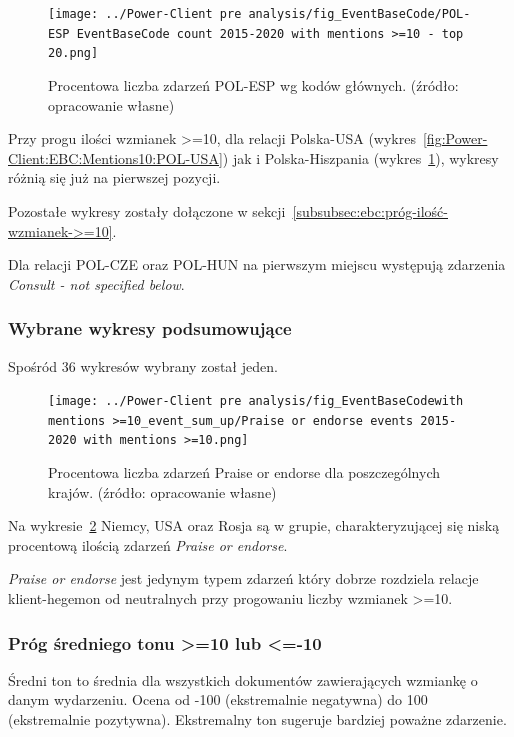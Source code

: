 \documentclass[11pt]{report}
\begin{document}
    \begin{figure}[!htp]
        \centering
        \texttt{[image: ../Power-Client pre analysis/fig\_EventBaseCode/POL-ESP EventBaseCode count 2015-2020 with mentions >=10 - top 20.png]}
        \caption{Procentowa liczba zdarzeń POL-ESP wg kodów głównych. (źródło: opracowanie własne)}
        \label{fig:Power-Client:EBC:Mentions10:POL-ESP}
    \end{figure}

    Przy progu ilości wzmianek >=10, dla relacji Polska-USA (wykres~\ref{fig:Power-Client:EBC:Mentions10:POL-USA}) jak i Polska-Hiszpania (wykres~\ref{fig:Power-Client:EBC:Mentions10:POL-ESP}),
    wykresy różnią się już na pierwszej pozycji.

    Pozostałe wykresy zostały dołączone w sekcji~\ref{subsubsec:ebc:próg-ilość-wzmianek->=10}.

    Dla relacji POL-CZE oraz POL-HUN na pierwszym miejscu występują zdarzenia \textit{Consult - not specified below}.

    \subsubsection{Wybrane wykresy podsumowujące}

    Spośród 36 wykresów wybrany został jeden.

    \begin{figure}[!htp]
        \centering
        \texttt{[image: ../Power-Client pre analysis/fig\_EventBaseCodewith mentions >=10\_event\_sum\_up/Praise or endorse events 2015-2020 with mentions >=10.png]}
        \caption{Procentowa liczba zdarzeń Praise or endorse dla poszczególnych krajów. (źródło: opracowanie własne)}
        \label{fig:Power-Client:ERC:Mentions10:SumUp:Praise or endorse}
    \end{figure}
    Na wykresie~\ref{fig:Power-Client:ERC:Mentions10:SumUp:Praise or endorse} Niemcy, USA oraz Rosja są w grupie,
    charakteryzującej się niską procentową ilością zdarzeń \textit{Praise or endorse}.

    \textit{Praise or endorse} jest jedynym typem zdarzeń który dobrze rozdziela relacje klient-hegemon od neutralnych
    przy progowaniu liczby wzmianek >=10.

    \subsubsection{Próg średniego tonu >=10 lub <=-10}
    Średni ton to średnia dla wszystkich dokumentów zawierających wzmiankę o danym wydarzeniu.
    Ocena od -100 (ekstremalnie negatywna) do 100 (ekstremalnie pozytywna).
    Ekstremalny ton sugeruje bardziej poważne zdarzenie.
\end{document}
